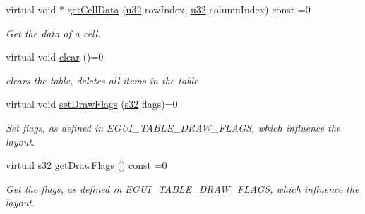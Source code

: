 \begin{DoxyCompactItemize}
\mbox{\label{classirr_1_1gui_1_1IGUITable_a73332c6970e47345d42dde26f1b992cd}} 
virtual void $\ast$ \hyperlink{classirr_1_1gui_1_1IGUITable_a73332c6970e47345d42dde26f1b992cd}{get\+Cell\+Data} (\hyperlink{namespaceirr_a0416a53257075833e7002efd0a18e804}{u32} row\+Index, \hyperlink{namespaceirr_a0416a53257075833e7002efd0a18e804}{u32} column\+Index) const =0
\begin{DoxyCompactList}\small\item\em Get the data of a cell. \end{DoxyCompactList}\item 
\mbox{\label{classirr_1_1gui_1_1IGUITable_ad0b1f8cefa1cbdcede986b16abc868c0}} 
virtual void \hyperlink{classirr_1_1gui_1_1IGUITable_ad0b1f8cefa1cbdcede986b16abc868c0}{clear} ()=0
\begin{DoxyCompactList}\small\item\em clears the table, deletes all items in the table \end{DoxyCompactList}\item 
\mbox{\label{classirr_1_1gui_1_1IGUITable_ae777eb5b146642659801d1af32b9c978}} 
virtual void \hyperlink{classirr_1_1gui_1_1IGUITable_ae777eb5b146642659801d1af32b9c978}{set\+Draw\+Flags} (\hyperlink{namespaceirr_ac66849b7a6ed16e30ebede579f9b47c6}{s32} flags)=0
\begin{DoxyCompactList}\small\item\em Set flags, as defined in E\+G\+U\+I\+\_\+\+T\+A\+B\+L\+E\+\_\+\+D\+R\+A\+W\+\_\+\+F\+L\+A\+GS, which influence the layout. \end{DoxyCompactList}\item 
\mbox{\label{classirr_1_1gui_1_1IGUITable_aeb6fc401f70a8aa21225663ec9195ee1}} 
virtual \hyperlink{namespaceirr_ac66849b7a6ed16e30ebede579f9b47c6}{s32} \hyperlink{classirr_1_1gui_1_1IGUITable_aeb6fc401f70a8aa21225663ec9195ee1}{get\+Draw\+Flags} () const =0
\begin{DoxyCompactList}\small\item\em Get the flags, as defined in E\+G\+U\+I\+\_\+\+T\+A\+B\+L\+E\+\_\+\+D\+R\+A\+W\+\_\+\+F\+L\+A\+GS, which influence the layout. \end{DoxyCompactList}\item 
\mbox{\label{classirr_1_1gui_1_1IGUITable_a5900df485398a4184ed8d8dbbd077f7e}} 

\end{DoxyCompactItemize}
